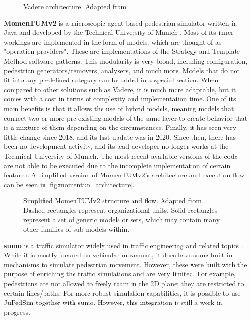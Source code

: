 \documentclass[twoside, 11pt]{article}
\begin{document}
\begin{figure}[h]
  \centering
  
  \caption[Vadere architecture]{Vadere architecture. Adapted from \cite{seitzSuperpositionPrincipleConceptual2016}}
  \label{fig:vadere_architecture}
\end{figure}

\textbf{MomenTUMv2} is a microscopic agent-based pedestrian simulator written in Java and developed by the Technical University of Munich \cite{kielarMomenTUMv2ModularExtensible2016}. Most of its inner workings are implemented in the form of models, which are thought of as "operation providers". These are implementations of the Strategy and Template Method software patterns. This modularity is very broad, including configuration, pedestrian generators/removers, analyzers, and much more. Models that do not fit into any predefined category can be added in a special section. When compared to other solutions such as Vadere, it is much more adaptable, but it comes with a cost in terms of complexity and implementation time. One of its main benefits is that it allows the use of hybrid models, meaning models that connect two or more pre-existing models of the same layer to create behavior that is a mixture of them depending on the circumstances. Finally, it has seen very little change since 2018, and its last update was in 2020. Since then, there has been no development activity, and its lead developer no longer works at the Technical University of Munich. The most recent available versions of the code are not able to be executed due to the incomplete implementation of certain features. A simplified version of MomenTUMv2's architecture and execution flow can be seen in \autoref{fig:momentun_architecture}.

\begin{figure}[h]
  \centering
  
  \caption[Simplified MomenTUMv2 structure and flow]{Simplified MomenTUMv2 structure and flow. Adapted from \cite{kielarMomenTUMv2ModularExtensible2016}. Dashed rectangles represent organizational units. Solid rectangles represent a set of generic models or sets, which may contain many other families of sub-models within.}
  \label{fig:momentun_architecture}
\end{figure}

\textbf{\gls{sumo}} is a traffic simulator widely used in traffic engineering and related topics \cite{SUMO2018}. While it is mostly focused on vehicular movement, it does have some built-in mechanisms to simulate pedestrian movement. However, these were built with the purpose of enriching the traffic simulations and are very limited. For example, pedestrians are not allowed to freely roam in the 2D plane; they are restricted to certain lines/paths. For more robust simulation capabilities, it is possible to use JuPedSim together with \gls{sumo}. However, this integration is still a work in progress.
\end{document}
